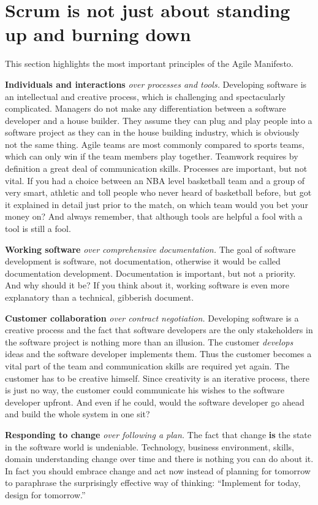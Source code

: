 \section{Scrum is not just about standing up and burning down}
This section highlights the most important principles of the Agile
Manifesto.

{\bf Individuals and interactions} \emph{over processes and tools.} Developing
software is an intellectual and creative process, which is challenging and spectacularly
complicated. Managers do not make any differentiation between a software
developer and a house builder. They assume they can plug and play people into a
software project as they can in the house building industry, which is obviously
not the same thing. Agile teams are most commonly compared to
sports teams, which can only win if the team members play together. Teamwork
requires by definition a great deal of communication skills. Processes are
important, but not vital. If you had a choice between an NBA level basketball
team and a group of very smart, athletic and toll people who never heard of
basketball before, but got it explained in detail just prior to the match, on
which team would you bet your money on? And always remember, that although tools
are helpful a fool with a tool is still a fool.

{\bf Working software} \emph{over comprehensive documentation.} The goal of
software development is software, not documentation, otherwise it would be called
documentation development.\cite{Ambler200204} Documentation is important, but
not a priority. And why should it be? If you think about it, working software is
even more explanatory than a technical, gibberish document.

{\bf Customer collaboration} \emph{over contract negotiation.} Developing software is a
creative process and the fact that software developers are the only stakeholders
in the software project is nothing more than an illusion. The customer
\emph{develops} ideas and the software developer implements them. Thus the
customer becomes a vital part of the team and communication skills are required
yet again. The customer has to be creative himself. Since creativity is an
iterative process, there is just no way, the customer could communicate his
wishes to the software developer upfront. And even if he could, would the
software developer go ahead and build the whole system in one sit?

{\bf Responding to change} \emph{over following a plan.} The fact that change {\bf is}
the state in the software world is undeniable. Technology, business environment,
skills, domain understanding change over time and there is nothing you can do
about it. In fact you should embrace change and act now instead of planning for
tomorrow to paraphrase the surprisingly effective way of thinking:
\enquote{Implement for today, design for tomorrow.}\cite{BeckAndres200411}

